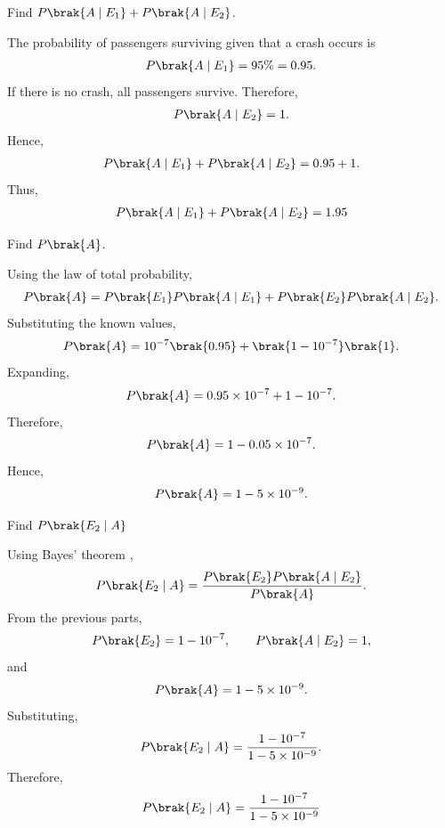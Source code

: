 \begin{enumerate}[label=\thesubsection.\arabic*, ref=\thesubsection.\theenumi]
 Find $P\brak{A\mid E_1}+P\brak{A\mid E_2}$.

\solution
The probability of passengers surviving given that a crash occurs
is
\begin{align}
P\brak{A\mid E_1}=95\%=0.95.
\end{align}
If there is no crash, all passengers survive. Therefore,
\begin{align}
P\brak{A\mid E_2}=1.
\end{align}
Hence,
\begin{align}
P\brak{A\mid E_1}+P\brak{A\mid E_2}=0.95+1.
\end{align}
Thus,
\begin{align}
P\brak{A\mid E_1}+P\brak{A\mid E_2}=1.95
\end{align}

 Find $P\brak{A}$.

\solution
Using the law of total probability,
\begin{align}
P\brak{A}=P\brak{E_1}P\brak{A\mid E_1}+P\brak{E_2}P\brak{A\mid E_2}.
\end{align}
Substituting the known values,
\begin{align}
P\brak{A}=10^{-7}\brak{0.95}+\brak{1-10^{-7}}\brak{1}.
\end{align}
Expanding,
\begin{align}
P\brak{A}=0.95\times10^{-7}+1-10^{-7}.
\end{align}
Therefore,
\begin{align}
P\brak{A}=1-0.05\times10^{-7}.
\end{align}
Hence,
\begin{align}
P\brak{A}=1-5\times10^{-9}.
\end{align}

 Find $P\brak{E_2\mid A}$ 

\solution
Using Bayes' theorem \label{eq:EE26BTECH11211-Prob_16},
\begin{align}
P\brak{E_2\mid A}
=\frac{P\brak{E_2}P\brak{A\mid E_2}}{P\brak{A}}.
\end{align}
From the previous parts,
\begin{align}
P\brak{E_2}=1-10^{-7},
\qquad P\brak{A\mid E_2}=1,
\end{align}
and
\begin{align}
P\brak{A}=1-5\times10^{-9}.
\end{align}
Substituting,
\begin{align}
P\brak{E_2\mid A}
=\frac{1-10^{-7}}{1-5\times10^{-9}}.
\end{align}
Therefore,
\begin{align}
P\brak{E_2\mid A}
=\frac{1-10^{-7}}{1-5\times10^{-9}}
\end{align}

\end{enumerate}

